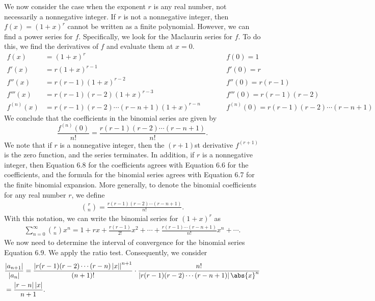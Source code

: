 \documentclass{report}
\begin{document}
    \bigbreak \noindent 
    We now consider the case when the exponent \( r \) is any real number, not necessarily a nonnegative integer. If \( r \) is not a nonnegative integer, then \( f(x) = (1+x)^r \) cannot be written as a finite polynomial. However, we can find a power series for \( f \). Specifically, we look for the Maclaurin series for \( f \). To do this, we find the derivatives of \( f \) and evaluate them at \( x=0 \).
    \begin{equation}
    \begin{alignedat}{2}
        f(x) &= (1+x)^r \quad \quad &&f(0) = 1 \\
        f'(x) &= r(1+x)^{r-1}\quad \quad  &&f'(0) = r \\
        f''(x) &= r(r-1)(1+x)^{r-2} \quad \quad && f''(0) = r(r-1) \\
        f'''(x) &= r(r-1)(r-2)(1+x)^{r-3} \quad \quad &&f'''(0) = r(r-1)(r-2) \\
        f^{(n)}(x) &= r(r-1)(r-2) \cdots (r-n+1)(1+x)^{r-n} \quad \quad &&f^{(n)}(0) = r(r-1)(r-2) \cdots (r-n+1)
    \end{alignedat}
    \end{equation}
    \bigbreak \noindent
    We conclude that the coefficients in the binomial series are given by
    \[
    \frac{f^{(n)}(0)}{n!} = \frac{r(r-1)(r-2) \cdots (r-n+1)}{n!}.
    \]
    \bigbreak \noindent 
    We note that if $r$ is a nonnegative integer, then the $(r+1)$st derivative $f^{(r+1)}$ is the zero function, and the series terminates. In addition, if $r$ is a nonnegative integer, then Equation 6.8 for the coefficients agrees with Equation 6.6 for the coefficients, and the formula for the binomial series agrees with Equation 6.7 for the finite binomial expansion. More generally, to denote the binomial coefficients for any real number $r$, we define
    \begin{align*}
    \binom{r}{n} = \frac{r(r-1)(r-2)\cdots(r-n+1)}{n!}.
    \end{align*}
    \bigbreak \noindent
    With this notation, we can write the binomial series for $(1 + x)^r$ as
    \begin{align*}
    \sum_{n=0}^{\infty} \binom{r}{n} x^n = 1 + rx + \frac{r(r-1)}{2!}x^2 + \cdots + \frac{r(r-1)\cdots(r-n+1)}{n!}x^n + \cdots. \tag{6.9}
    \end{align*}
    \bigbreak \noindent
    We now need to determine the interval of convergence for the binomial series Equation 6.9. We apply the ratio test. Consequently, we consider
    \bigbreak \noindent 
    \begin{align*}
    &\frac{\left| a_{n+1} \right|}{\left| a_n \right|} = \frac{\left| r(r-1)(r-2)\cdots(r-n) \left| x \right|\right|^{n+1} }{(n+1)!} \cdot \frac{n!}{\left|r(r-1)(r-2)\cdots (r-n+1)\right|\abs{x}^{n}}  \\
    &= \frac{\left| r-n \right| \left| x \right|}{n+1}.
    \end{align*}
\end{document}
